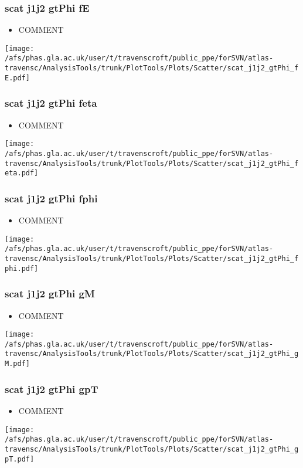 \documentclass{beamer}
\begin{document}
\begin{frame}
\frametitle{scat j1j2 gtPhi fE}
\begin{itemize}
\item COMMENT
\end{itemize}
\begin{center}
\texttt{[image: /afs/phas.gla.ac.uk/user/t/travenscroft/public\_ppe/forSVN/atlas-travensc/AnalysisTools/trunk/PlotTools/Plots/Scatter/scat\_j1j2\_gtPhi\_fE.pdf]}
\end{center}
\end{frame}

\begin{frame}
\frametitle{scat j1j2 gtPhi feta}
\begin{itemize}
\item COMMENT
\end{itemize}
\begin{center}
\texttt{[image: /afs/phas.gla.ac.uk/user/t/travenscroft/public\_ppe/forSVN/atlas-travensc/AnalysisTools/trunk/PlotTools/Plots/Scatter/scat\_j1j2\_gtPhi\_feta.pdf]}
\end{center}
\end{frame}

\begin{frame}
\frametitle{scat j1j2 gtPhi fphi}
\begin{itemize}
\item COMMENT
\end{itemize}
\begin{center}
\texttt{[image: /afs/phas.gla.ac.uk/user/t/travenscroft/public\_ppe/forSVN/atlas-travensc/AnalysisTools/trunk/PlotTools/Plots/Scatter/scat\_j1j2\_gtPhi\_fphi.pdf]}
\end{center}
\end{frame}

\begin{frame}
\frametitle{scat j1j2 gtPhi gM}
\begin{itemize}
\item COMMENT
\end{itemize}
\begin{center}
\texttt{[image: /afs/phas.gla.ac.uk/user/t/travenscroft/public\_ppe/forSVN/atlas-travensc/AnalysisTools/trunk/PlotTools/Plots/Scatter/scat\_j1j2\_gtPhi\_gM.pdf]}
\end{center}
\end{frame}

\begin{frame}
\frametitle{scat j1j2 gtPhi gpT}
\begin{itemize}
\item COMMENT
\end{itemize}
\begin{center}
\texttt{[image: /afs/phas.gla.ac.uk/user/t/travenscroft/public\_ppe/forSVN/atlas-travensc/AnalysisTools/trunk/PlotTools/Plots/Scatter/scat\_j1j2\_gtPhi\_gpT.pdf]}
\end{center}
\end{frame}
\end{document}
